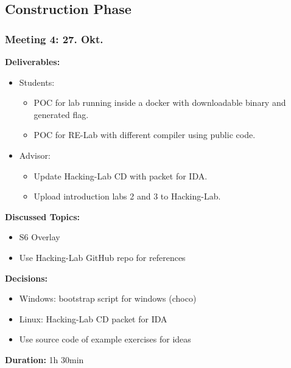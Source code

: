 \newpage
\subsection*{Construction Phase}
\subsubsection*{Meeting 4: 27. Okt.}
\textbf{Deliverables:} 
\begin{itemize}
    \item Students:
    \begin{itemize}
        \item POC for lab running inside a docker with downloadable binary and generated flag.
        \item POC for RE-Lab with different compiler using public code.
    \end{itemize}
    \item Advisor:
    \begin{itemize}
        \item Update Hacking-Lab CD with packet for IDA.
        \item Upload introduction labs 2 and 3 to Hacking-Lab.
    \end{itemize}
\end{itemize}
\textbf{Discussed Topics:} 
\begin{itemize}
    \item S6 Overlay
    \item Use Hacking-Lab GitHub repo for references
\end{itemize}
\textbf{Decisions:} 
\begin{itemize}
    \item Windows: bootstrap script for windows (choco)
    \item Linux: Hacking-Lab CD packet for IDA
    \item Use source code of example exercises for ideas
\end{itemize}
\textbf{Duration:} 1h 30min

\newpage
